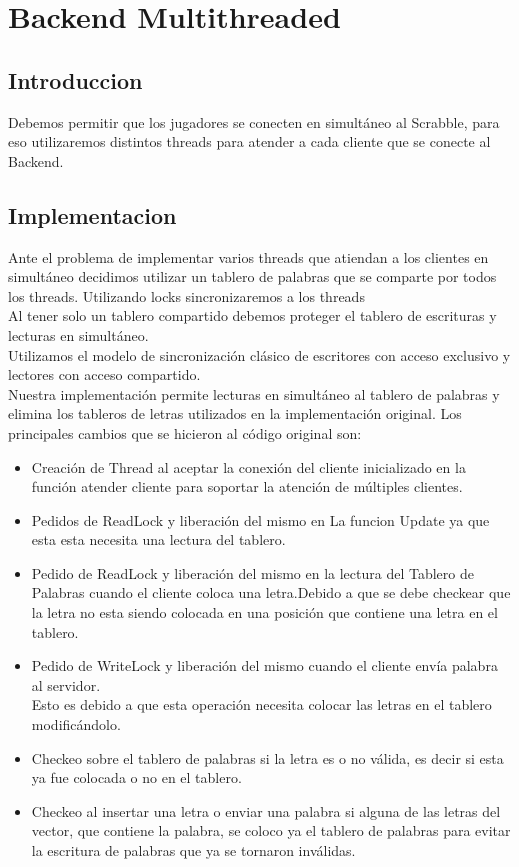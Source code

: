\section{Backend Multithreaded}
\subsection{Introduccion}
Debemos permitir que los jugadores se conecten en simultáneo al Scrabble, para eso utilizaremos distintos threads para atender a cada cliente que se conecte al Backend.
\subsection{Implementacion}
Ante el problema de implementar varios threads que atiendan a los clientes en simultáneo decidimos utilizar un tablero de palabras que se comparte por todos los threads. Utilizando locks sincronizaremos a los threads \\
Al tener solo un tablero compartido debemos proteger el tablero de escrituras y lecturas en simultáneo.\\
Utilizamos el modelo de sincronización clásico de escritores con acceso exclusivo y lectores con acceso compartido.\\
Nuestra implementación permite lecturas en simultáneo al tablero de palabras y elimina los tableros de letras utilizados en la implementación original.
Los principales cambios que se hicieron al código original son:
\begin{itemize}
	\item Creación de Thread al aceptar la conexión del cliente inicializado en la función atender cliente para soportar la atención de múltiples clientes.
    \item Pedidos de ReadLock y liberación del mismo en La funcion Update ya que esta esta necesita una lectura del tablero.
    \item Pedido de ReadLock y liberación del mismo en la lectura del Tablero de Palabras cuando el cliente coloca una letra.Debido a que se debe checkear que la letra no esta siendo colocada en una posición que contiene una letra en el tablero.
    \item Pedido de WriteLock y liberación del mismo cuando el cliente envía palabra al servidor.\\
    Esto es debido a que esta operación necesita colocar las letras en el tablero modificándolo.
    \item Checkeo sobre el tablero de palabras si la letra es o no válida, es decir si esta ya fue colocada o no en el tablero.
    \item Checkeo al insertar una letra o enviar una palabra si alguna de las letras del vector, que contiene la palabra, se coloco ya el tablero de palabras para evitar la escritura de palabras que ya se tornaron inválidas.
\end{itemize}


